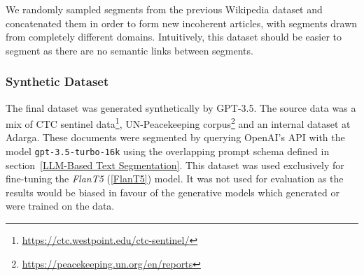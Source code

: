 We randomly sampled segments from the previous Wikipedia dataset and concatenated them in order to form new incoherent articles, with segments drawn from completely different domains. Intuitively, this dataset should be easier to segment as there are no semantic links between segments.

\subsubsection{Synthetic Dataset}

The final dataset was generated synthetically by GPT-3.5. The source data was a mix of CTC sentinel data\footnote{\url{https://ctc.westpoint.edu/ctc-sentinel/}}, UN-Peacekeeping corpus\footnote{\url{https://peacekeeping.un.org/en/reports}} and an internal dataset at Adarga. These documents were segmented by querying OpenAI's API with the model \texttt{gpt-3.5-turbo-16k} using the overlapping prompt schema defined in section~\ref{LLM-Based Text Segmentation}. This dataset was used exclusively for fine-tuning the \emph{FlanT5} (\ref{FlanT5}) model. It was not used for evaluation as the results would be biased in favour of the generative models which generated or were trained on the data.